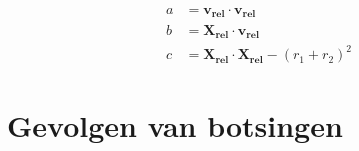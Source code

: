 \documentclass[12pt,a4paper]{article}
\begin{document}
	\begin{equation}
		\begin{aligned}
			a &= \mathbf{v_{rel}} \cdot \mathbf{v_{rel}} \\
			b &= \mathbf{X_{rel}} \cdot \mathbf{v_{rel}} \\
			c &= \mathbf{X_{rel}} \cdot \mathbf{X_{rel}} - (r_1 + r_2)^2
		\end{aligned}
	\end{equation}
	
	\section{Gevolgen van botsingen}
\end{document}
